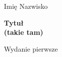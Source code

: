 

\thispagestyle{empty}
{\noindent\fontsize{18pt}{18pt}\selectfont Imię Nazwisko}

\noindent\makebox[\linewidth]{\rule{\textwidth}{1pt}}

\vspace{10mm}

{\noindent\fontsize{24pt}{24pt}\selectfont \textbf{Tytuł\\(takie tam)}}
\vspace{10mm}

{\noindent\fontsize{14pt}{14pt}\selectfont Wydanie pierwsze}

\newpage


